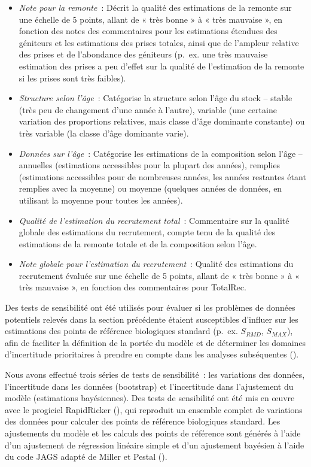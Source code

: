 \documentclass[french,11pt]{book}
\begin{document}
\begin{itemize}

\item
  \emph{Note pour la remonte}~: Décrit la qualité des estimations de la remonte sur une échelle de 5 points, allant de « très bonne » à « très mauvaise », en fonction des notes des commentaires pour les estimations étendues des géniteurs et les estimations des prises totales, ainsi que de l'ampleur relative des prises et de l'abondance des géniteurs (p.~ex. une très mauvaise estimation des prises a peu d'effet sur la qualité de l'estimation de la remonte si les prises sont très faibles).
\item
  \emph{Structure selon l'âge}~: Catégorise la structure selon l'âge du stock -- stable (très peu de changement d'une année à l'autre), variable (une certaine variation des proportions relatives, mais classe d'âge dominante constante) ou très variable (la classe d'âge dominante varie).
\item
  \emph{Données sur l'âge}~: Catégorise les estimations de la composition selon l'âge -- annuelles (estimations accessibles pour la plupart des années), remplies (estimations accessibles pour de nombreuses années, les années restantes étant remplies avec la moyenne) ou moyenne (quelques années de données, en utilisant la moyenne pour toutes les années).
\item
  \emph{Qualité de l'estimation du recrutement total}~: Commentaire sur la qualité globale des estimations du recrutement, compte tenu de la qualité des estimations de la remonte totale et de la composition selon l'âge.
\item
  \emph{Note globale pour l'estimation du recrutement}~: Qualité des estimations du recrutement évaluée sur une échelle de 5 points, allant de « très bonne » à « très mauvaise », en fonction des commentaires pour TotalRec.
\end{itemize}
Des tests de sensibilité ont été utilisés pour évaluer si les problèmes de données potentiels relevés dans la section précédente étaient susceptibles d'influer sur les estimations des points de référence biologiques standard (p.~ex. \(S_{RMD}\), \(S_{MAX}\)), afin de faciliter la définition de la portée du modèle et de déterminer les domaines d'incertitude prioritaires à prendre en compte dans les analyses subséquentes ().

Nous avons effectué trois séries de tests de sensibilité~: les variations des données, l'incertitude dans les données (bootstrap) et l'incertitude dans l'ajustement du modèle (estimations bayésiennes). Des tests de sensibilité ont été mis en œuvre avec le progiciel RapidRicker (), qui reproduit un ensemble complet de variations des données pour calculer des points de référence biologiques standard. Les ajustements du modèle et les calculs des points de référence sont générés à l'aide d'un ajustement de régression linéaire simple et d'un ajustement bayésien à l'aide du code JAGS adapté de Miller et Pestal ().
\end{document}
